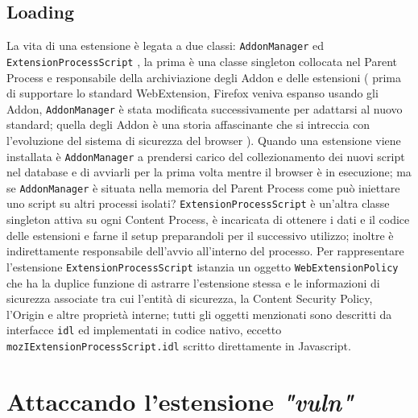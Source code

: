 \documentclass[]{./sapthesis/sapthesis}
\newcommand{\code}[1]{\texttt{#1}}
\newcommand{\vuln}{\textit{"vuln"}}
\newcommand{\idl}{\code{idl} }
\newcommand{\AddonManager}{\code{AddonManager} }
\newcommand{\ExtensionProcessScript}{\code{ExtensionProcessScript} }
\newcommand{\WebExtensionPolicy}{\code{WebExtensionPolicy} }
\begin{document}
    \section{ Loading }
        La vita di una estensione è legata a due classi: \AddonManager ed \ExtensionProcessScript,
        la prima è una classe singleton collocata nel Parent Process e responsabile della archiviazione
        degli Addon e delle estensioni ( prima di supportare lo standard WebExtension, Firefox veniva espanso
        usando gli Addon, \AddonManager è stata modificata successivamente per adattarsi al nuovo standard; quella degli
        Addon è una storia affascinante che si intreccia con l'evoluzione del sistema di sicurezza del browser ).
        Quando una estensione viene installata è \AddonManager a prendersi carico del collezionamento dei nuovi
        script nel database e di avviarli per la prima volta mentre il browser è in esecuzione; ma se \AddonManager
        è situata nella memoria del Parent Process come può iniettare uno script su altri processi isolati?
        \ExtensionProcessScript è un'altra classe singleton attiva su ogni Content Process, è incaricata di
        ottenere i dati e il codice delle estensioni e farne il setup preparandoli per il successivo utilizzo;
        inoltre è indirettamente responsabile dell'avvio all'interno del processo. Per rappresentare l'estensione
        \ExtensionProcessScript istanzia un oggetto \WebExtensionPolicy che ha la duplice funzione di astrarre
        l'estensione stessa e le informazioni di sicurezza associate tra cui l'entità di sicurezza,
        la Content Security Policy, l'Origin e altre proprietà interne; tutti gli oggetti menzionati sono
        descritti da interfacce \idl ed implementati in codice nativo, eccetto \code{mozIExtensionProcessScript.idl}
        scritto direttamente in Javascript. 
         

\newpage

\chapter{Attaccando l'estensione \vuln}
\end{document}
